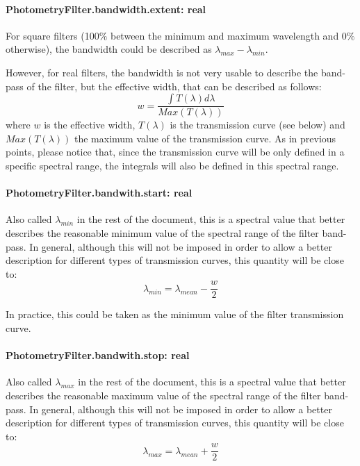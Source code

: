 \documentclass[11pt,a4paper]{ivoa}
\begin{document}
\paragraph{PhotometryFilter.bandwidth.extent: real}
For square filters (100$\%$  between the minimum and maximum wavelength and 0$\%$  otherwise),
the bandwidth could be described as $\lambda_{max} - \lambda_{min}$.
\par

However, for real filters, the bandwidth is not very usable to describe the band-pass of the
filter, but the effective width, that can be described as follows:
\begin{equation} \label{eq:21}
w = \frac{\int T(\lambda)d\lambda}{Max(T(\lambda))}
\end{equation}
where $w$ is the effective width, $T(\lambda)$ is the transmission curve (see below)
and $Max(T(\lambda))$ the maximum value of the transmission curve. As in previous points,
please notice that, since the transmission curve will be only defined in a specific spectral
range, the integrals will also be defined in this spectral range.
\par

\paragraph{PhotometryFilter.bandwith.start: real}
Also called $\lambda_{min}$ in the rest of the document, this is a spectral value that better describes
the reasonable minimum value of the spectral range of the filter band-pass. In general,
although this
will not be imposed in order to allow a better description for different types of
transmission curves, this quantity will be close to:
\begin{equation} \label{eq:22}
\lambda_{min} = \lambda_{mean} - \frac{w}{2}
\end{equation}

In practice, this could be taken as the minimum value of the filter transmission curve.
\par

\paragraph{PhotometryFilter.bandwith.stop: real}
Also called $\lambda_{max}$ in the rest of the document, this is a spectral value that
better describes the reasonable maximum value of the spectral range of the filter band-pass.
In general,
although this will not be imposed in order to allow a better description for different
types of transmission curves, this quantity will be close to:
\begin{equation} \label{eq:23}
\lambda_{max} = \lambda_{mean} + \frac{w}{2}
\end{equation}
\end{document}
